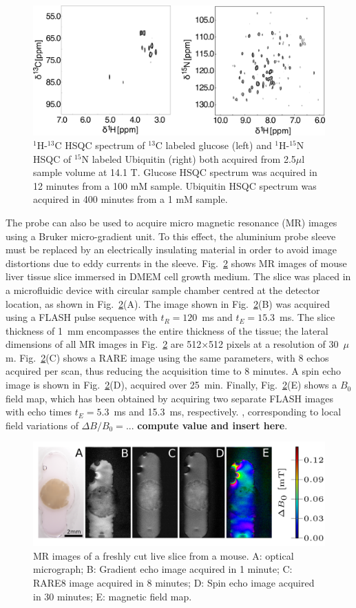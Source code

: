 \documentclass[preprint,5p]{elsarticle}
\newcommand{\todo}[1]{{\color{red}\textbf{#1}}}
\newcommand{\fig}[1]{Fig.~\ref{#1}}
\begin{document}
\begin{figure}
\centering
\includegraphics[width=.7\linewidth,keepaspectratio=true]{./figures/ms5n17-tlp-sp-180612-HSQCspect.png} 
\caption{ $^1$H-$^{13}$C HSQC spectrum of $^{13}$C labeled glucose (left) and $^1$H-$^{15}$N HSQC of $^{15}$N labeled Ubiquitin (right) both acquired from 2.5$\mu$l sample volume at 14.1 T. Glucose HSQC spectrum was acquired in 12 minutes from a 100 mM sample. Ubiquitin HSQC spectrum was acquired in 400 minutes from a 1 mM sample.}
\label{fig:HSQC} 
\end{figure}
The probe can also be used to acquire micro magnetic resonance (MR) images using a Bruker micro-gradient unit. 
To this effect, the aluminium probe sleeve must be replaced by an electrically insulating material in order to 
avoid image distortions due to eddy currents in the sleeve. 
\fig{fig:tisli} shows MR images of mouse liver tissue slice 
immersed in DMEM cell growth medium.
The slice was placed in a microfluidic device with circular sample chamber centred at the detector location, as 
shown in \fig{fig:tisli}(A). 
The image shown in \fig{fig:tisli}(B) was acquired using a FLASH pulse sequence with
$t_R=120$~ms and $t_E=15.3$~ms. The slice thickness of  1~mm encompasses the entire thickness of the tissue; the 
lateral dimensions of all MR images in \fig{fig:tisli} are 512$\times$512 pixels
at a resolution of 30~$\mu$m.
\fig{fig:tisli}(C) shows a RARE image using the same parameters, with 8 echos
acquired per scan, thus reducing the acquisition time to 8 minutes.
A spin echo image is shown in \fig{fig:tisli}(D), acquired over 25~min. Finally,
\fig{fig:tisli}(E) shows a $B_0$ field map, which has been obtained by acquiring
two separate FLASH images with echo times $t_E=5.3$~ms and 15.3~ms, respectively.
, corresponding to local field variations of $\Delta B/B_0=...$ 
\todo{compute value and insert here}.


\begin{figure}
\centering
\includegraphics[width=.8\linewidth,keepaspectratio=true]{./figures/ms5n17-tisli-im-180511.png} 
\caption{MR images of a freshly cut live slice from a mouse. A: optical micrograph; B: Gradient echo image acquired in 1 minute; C: RARE8 image acquired in 8 minutes; D: Spin echo image acquired in 30 minutes; E: magnetic field map.}
\label{fig:tisli} 
\end{figure}
\end{document}
